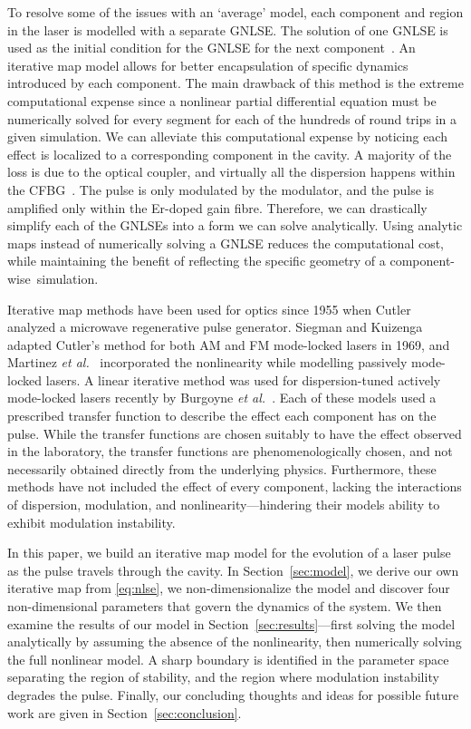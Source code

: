 \documentclass[9pt,twocolumn,twoside]{osajnl}
\begin{document}
To resolve some of the issues with an `average' model, each component and region in the laser is modelled with a separate GNLSE. The solution of one GNLSE is used as the initial condition for the GNLSE for the next component~\cite{lapre2019, meng2020, oktem2010, woodward2018}. An iterative map model allows for better encapsulation of specific dynamics introduced by each component. The main drawback of this method is the extreme computational expense since a nonlinear partial differential equation must be numerically solved for every segment for each of the hundreds of round trips in a given simulation. We can alleviate this computational expense by noticing each effect is localized to a corresponding component in the cavity. A majority of the loss is due to the optical coupler, and virtually all the dispersion happens within the CFBG~\cite{agrawal2002}. The pulse is only modulated by the modulator, and the pulse is amplified only within the Er-doped gain fibre. Therefore, we can drastically simplify each of the GNLSEs into a form we can solve analytically. Using analytic maps instead of numerically solving a GNLSE reduces the computational cost, while maintaining the benefit of reflecting the specific geometry of a component-wise~simulation.

Iterative map methods have been used for optics since 1955 when Cutler~\cite{cutler1955} analyzed a microwave regenerative pulse generator. Siegman and Kuizenga~\cite{kuizenga1970a, kuizenga1970b, kuizenga1970, siegman1969} adapted Cutler's method for both AM and FM mode-locked lasers in 1969, and Martinez \emph{et al.}~\cite{martinez1984, martinez1985} incorporated the nonlinearity while modelling passively mode-locked lasers. A linear iterative method was used for dispersion-tuned actively mode-locked lasers recently by Burgoyne \emph{et al.}~\cite{burgoyne2014}. Each of these models used a prescribed transfer function to describe the effect each component has on the pulse. While the transfer functions are chosen suitably to have the effect observed in the laboratory, the transfer functions are phenomenologically chosen, and not necessarily obtained directly from the underlying physics. Furthermore, these methods have not included the effect of every component, lacking the interactions of dispersion, modulation, and nonlinearity---hindering their models ability to exhibit modulation instability.

In this paper, we build an iterative map model for the evolution of a laser pulse as the pulse travels through the cavity. In Section~\ref{sec:model}, we derive our own iterative map from \eqref{eq:nlse}, we non-dimensionalize the model and discover four non-dimensional parameters that govern the dynamics of the system. We then examine the results of our model in Section~\ref{sec:results}---first solving the model analytically by assuming the absence of the nonlinearity, then numerically solving the full nonlinear model. A sharp boundary is identified in the parameter space separating the region of stability, and the region where modulation instability degrades the pulse. Finally, our concluding thoughts and ideas for possible future work are given in Section~\ref{sec:conclusion}.
\end{document}
